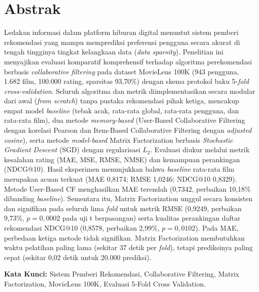 \chapter*{Abstrak}

Ledakan informasi dalam platform hiburan digital menuntut sistem pemberi rekomendasi yang mampu memprediksi preferensi pengguna secara akurat di tengah tingginya tingkat kelangkaan data (\textit{data sparsity}). Penelitian ini menyajikan evaluasi komparatif komprehensif terhadap algoritma perekomendasi berbasis \textit{collaborative filtering} pada dataset MovieLens 100K (943 pengguna, 1.682 film, 100.000 rating, sparsitas 93,70\%) dengan skema protokol baku 5-\textit{fold cross-validation}. Seluruh algoritma dan metrik diimplementasikan secara modular dari awal (\textit{from scratch}) tanpa pustaka rekomendasi pihak ketiga, mencakup empat model \textit{baseline} (tebak acak, rata-rata global, rata-rata pengguna, dan rata-rata film), dua metode \textit{memory-based} (User-Based Collaborative Filtering dengan korelasi Pearson dan Item-Based Collaborative Filtering dengan \textit{adjusted cosine}), serta metode \textit{model-based} Matrix Factorization berbasis \textit{Stochastic Gradient Descent} (SGD) dengan regularisasi $L_2$. Evaluasi diukur melalui metrik kesalahan rating (MAE, MSE, RMSE, NMSE) dan kemampuan perankingan (NDCG@10). Hasil eksperimen menunjukkan bahwa \textit{baseline} rata-rata film merupakan acuan terkuat (MAE 0,8174; RMSE 1,0246; NDCG@10 0,8329). Metode User-Based CF menghasilkan MAE terendah (0,7342, perbaikan 10,18\% dibanding \textit{baseline}). Sementara itu, Matrix Factorization unggul secara konsisten dan signifikan pada seluruh lima \textit{fold} untuk metrik RMSE (0,9249, perbaikan 9,73\%, $p = 0,0002$ pada uji t berpasangan) serta kualitas perankingan daftar rekomendasi NDCG@10 (0,8578, perbaikan 2,99\%, $p = 0,0102$). Pada MAE, perbedaan ketiga metode tidak signifikan. Matrix Factorization membutuhkan waktu pelatihan paling lama (sekitar 37 detik per \textit{fold}), tetapi prediksinya paling cepat (sekitar 0,02 detik untuk 20.000 prediksi).

\vspace{0.5 cm}
\begin{flushleft}
{\textbf{Kata Kunci:} Sistem Pemberi Rekomendasi, Collaborative Filtering, Matrix Factorization, MovieLens 100K, Evaluasi 5-Fold Cross Validation.}
\end{flushleft}
